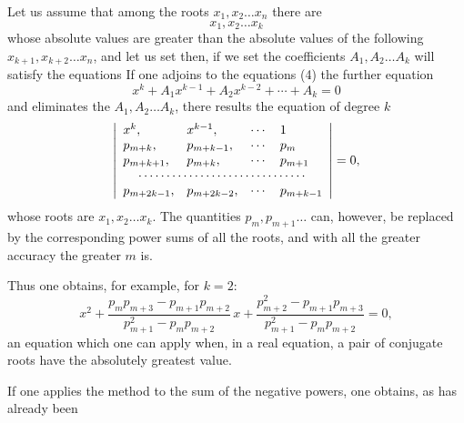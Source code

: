 Let us assume that among the roots $x_1, x_2 \ldots x_n$ there are
\[
x_1, x_2 \ldots x_k
\]
whose absolute values are greater than the absolute values of the following $x_{k+1}, x_{k+2} \ldots x_n$, and let us set
then, if we set
the coefficients $A_1, A_2 \ldots A_k$ will satisfy the equations
If one adjoins to the equations (4) the further equation
\[
x^k + A_1 x^{k-1} + A_2 x^{k-2} + \cdots + A_k = 0
\]
and eliminates the $A_1, A_2 \ldots A_k$, there results the equation of degree $k$
\[
\left|
\begin{array}{llll}
x^k, & x^{k-1}, & \cdots & 1\\
p_{m+k}, & p_{m+k-1}, & \cdots & p_m\\
p_{m+k+1}, & p_{m+k}, & \cdots & p_{m+1}\\
\multicolumn{4}{c}{\cdots\cdots\cdots\cdots\cdots\cdots\cdots\cdots\cdots\cdots}\\
p_{m+2k-1}, & p_{m+2k-2}, & \cdots & p_{m+k-1}
\end{array}
\right| = 0,
\]
whose roots are $x_1, x_2 \ldots x_k$. The quantities $p_m, p_{m+1} \ldots$ can, however, be replaced by the corresponding power sums of all the roots, and with all the greater accuracy the greater $m$ is.

Thus one obtains, for example, for $k = 2$:
\[
x^2 + \frac{p_m p_{m+3} - p_{m+1}p_{m+2}}{p_{m+1}^2 - p_m p_{m+2}}\, x + \frac{p_{m+2}^2 - p_{m+1}p_{m+3}}{p_{m+1}^2 - p_m p_{m+2}} = 0,
\]
an equation which one can apply when, in a real equation, a pair of conjugate roots have the absolutely greatest value.

If one applies the  method to the sum of the negative powers, one obtains, as has already been

